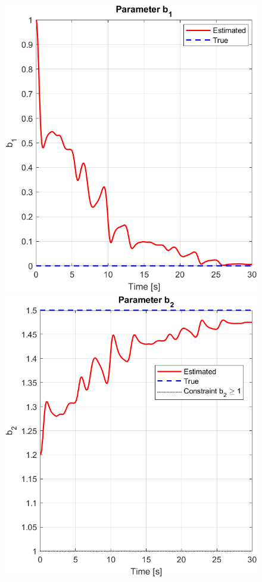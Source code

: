 \documentclass[12pt]{article} %
\numberwithin{equation}{section}  %
\begin{document}
\begin{figure}[ht!]
    \centering
    \begin{minipage}{0.48\textwidth}
        \centering
        \includegraphics[width=0.7\linewidth]{plots/plot4_a_b1.png}
    \end{minipage}
    \hfill
    \begin{minipage}{0.48\textwidth}
        \centering
        \includegraphics[width=0.7\linewidth]{plots/plot4_b_b2.png}
    \end{minipage}
    
    \vspace{1em} %
    

\end{figure}
\end{document}
